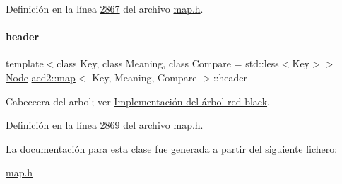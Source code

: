 Definición en la línea \hyperlink{map_8h_source_l02867}{2867} del archivo \hyperlink{map_8h_source}{map.\+h}.

\mbox{\label{classaed2_1_1map_a92d93f905c8ad73fba18fdc7e8915cce_a92d93f905c8ad73fba18fdc7e8915cce}} 
\paragraph{\texorpdfstring{header}{header}}
{\footnotesize\ttfamily template$<$class Key, class Meaning, class Compare = std\+::less$<$\+Key$>$$>$ \\
\hyperlink{structaed2_1_1map_1_1Node}{Node} \hyperlink{classaed2_1_1map}{aed2\+::map}$<$ Key, Meaning, Compare $>$\+::header\hspace{0.3cm}{\ttfamily [private]}}



Cabeceera del arbol; ver \hyperlink{Implementacion}{Implementación del árbol red-\/black}. 



Definición en la línea \hyperlink{map_8h_source_l02869}{2869} del archivo \hyperlink{map_8h_source}{map.\+h}.



La documentación para esta clase fue generada a partir del siguiente fichero\+:\begin{DoxyCompactItemize}
\item 
\hyperlink{map_8h}{map.\+h}\end{DoxyCompactItemize}
